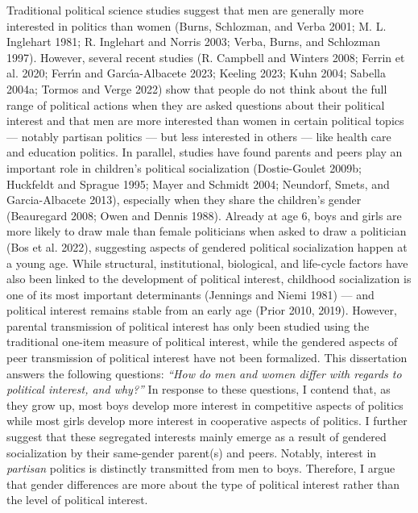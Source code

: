 \documentclass[
  letterpaper,
  DIV=11,
  numbers=noendperiod]{scrreprt}
\begin{document}
Traditional political science studies suggest that men are generally
more interested in politics than women (Burns, Schlozman, and Verba
2001; M. L. Inglehart 1981; R. Inglehart and Norris 2003; Verba, Burns,
and Schlozman 1997). However, several recent studies (R. Campbell and
Winters 2008; Ferrin et al. 2020; Ferrı́n and Garcı́a-Albacete 2023;
Keeling 2023; Kuhn 2004; Sabella 2004a; Tormos and Verge 2022) show that
people do not think about the full range of political actions when they
are asked questions about their political interest and that men are more
interested than women in certain political topics --- notably partisan
politics --- but less interested in others --- like health care and
education politics. In parallel, studies have found parents and peers
play an important role in children's political socialization
(Dostie-Goulet 2009b; Huckfeldt and Sprague 1995; Mayer and Schmidt
2004; Neundorf, Smets, and Garcia-Albacete 2013), especially when they
share the children's gender (Beauregard 2008; Owen and Dennis 1988).
Already at age 6, boys and girls are more likely to draw male than
female politicians when asked to draw a politician (Bos et al. 2022),
suggesting aspects of gendered political socialization happen at a young
age. While structural, institutional, biological, and life-cycle factors
have also been linked to the development of political interest,
childhood socialization is one of its most important determinants
(Jennings and Niemi 1981) --- and political interest remains stable from
an early age (Prior 2010, 2019). However, parental transmission of
political interest has only been studied using the traditional one-item
measure of political interest, while the gendered aspects of peer
transmission of political interest have not been formalized. This
dissertation answers the following questions: \emph{``How do men and
women differ with regards to political interest, and why?''} In response
to these questions, I contend that, as they grow up, most boys develop
more interest in competitive aspects of politics while most girls
develop more interest in cooperative aspects of politics. I further
suggest that these segregated interests mainly emerge as a result of
gendered socialization by their same-gender parent(s) and peers.
Notably, interest in \emph{partisan} politics is distinctly transmitted
from men to boys. Therefore, I argue that gender differences are more
about the type of political interest rather than the level of political
interest.
\end{document}
